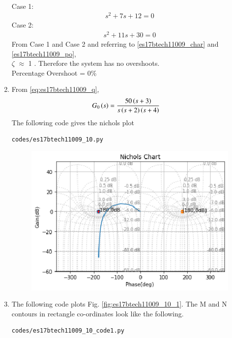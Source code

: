 \begin{enumerate}[label=\thesection.\arabic*.,ref=\thesection.\theenumi]
\begin{align}
 \end{align}
 Case 1:
 \begin{align}
s^2 + 7s + 12 = 0 
\end{align}
Case 2:
 \begin{align}
s^2 + 11s + 30 =0
 \end{align}
From Case 1 and Case 2 and referring to \eqref{es17btech11009_char} and \eqref{es17btech11009_po},
\\
  $\zeta$  $\approx$ 1 . Therefore the system has no overshoots.
  \\
  Percentage Overshoot = 0\%
\item
From \eqref{eq:es17btech11009_q},
\begin{align}
G_0\brak{s} &=\frac{50\brak{s+3}}{s\brak{s+2}\brak{s+4}}
\label{eq:es17btech11009_jj}
\end{align}
\solution 
The following code gives the nichols plot
\begin{lstlisting}
codes/es17btech11009_10.py
\end{lstlisting}
\begin{figure}[!h]
\includegraphics[width=\columnwidth]{./figs/es17btech11009_10.eps}
\caption{}
\label{fig:es17btech11009_10}
\end{figure}
\item
The following code plots Fig. \ref{fig:es17btech11009_10_1}.
The M and N contours in rectangle co-ordinates look like the following.
\begin{lstlisting}
codes/es17btech11009_10_code1.py
\end{lstlisting}
\begin{figure}[!h]

\end{figure}
\end{enumerate}
